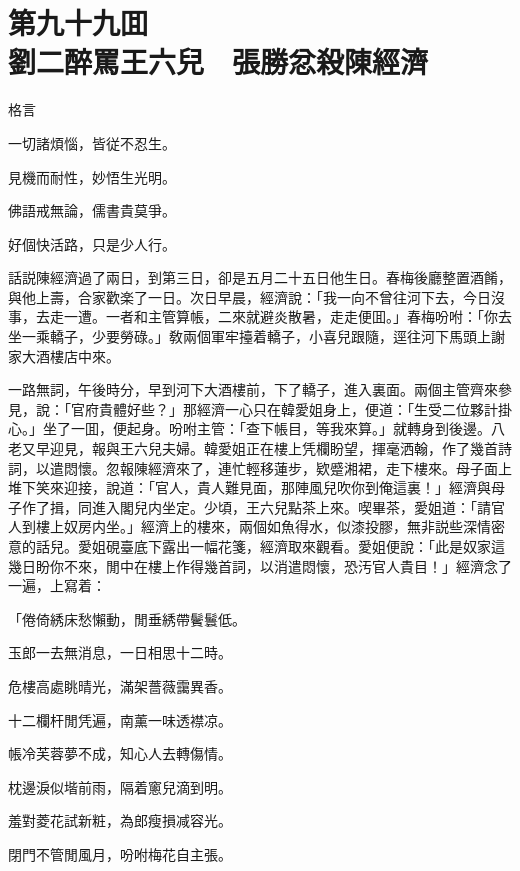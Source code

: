
\chapter*{第九十九囬　\\劉二醉罵王六兒　張勝忿殺陳經濟}


格言

\begin{myquote}
一切諸煩惱，皆従不忍生。

見機而耐性，妙悟生光明。

佛語戒無論，儒書貴莫爭。

好個快活路，只是少人行。
\end{myquote}

話説陳經濟過了兩日，到第三日，卻是五月二十五日他生日。春梅後廳整置酒餚，與他上壽，合家歡楽了一日。次日早晨，經濟說：「我一向不曾往河下去，今日沒事，去走一遭。一者和主管算帳，二來就避炎散暑，走走便囬。」春梅吩咐：「你去坐一乘轎子，少要勞碌。」敎兩個軍牢擡着轎子，小喜兒跟隨，逕往河下馬頭上謝家大酒樓店中來。

一路無詞，午後時分，早到河下大酒樓前，下了轎子，進入裏面。兩個主管齊來參見，說：「官府貴體好些？」那經濟一心只在韓愛姐身上，便道：「生受二位夥計掛心。」坐了一囬，便起身。吩咐主管：「查下帳目，等我來算。」就轉身到後邊。八老又早迎見，報與王六兒夫婦。韓愛姐正在樓上凭欄盼望，揮毫洒翰，作了幾首詩詞，以遣悶懷。忽報陳經濟來了，連忙輕移蓮步，欵蹙湘裙，走下樓來。母子面上堆下笑來迎接，說道：「官人，貴人難見面，那陣風兒吹你到俺這裏！」經濟與母子作了揖，同進入閣兒内坐定。少頃，王六兒點茶上來。喫畢茶，愛姐道：「請官人到樓上奴房内坐。」經濟上的樓來，兩個如魚得水，似漆投膠，無非説些深情密意的話兒。愛姐硯臺底下露出一幅花箋，經濟取來觀看。愛姐便說：「此是奴家這幾日盼你不來，閒中在樓上作得幾首詞，以消遣悶懷，恐汚官人貴目！」經濟念了一遍，上寫着：

\begin{myquote}
「倦倚綉床愁懶動，閒垂綉帶鬢鬟低。

玉郎一去無消息，一日相思十二時。


危樓高處眺晴光，滿架薔薇靄異香。

十二欄杆閒凭遍，南薰一味透襟凉。


帳冷芙蓉夢不成，知心人去轉傷情。

枕邊淚似堦前雨，隔着窻兒滴到明。


羞對菱花試新粧，為郎瘦損减容光。

閉門不管閒風月，吩咐梅花自主張。

\end{myquote}

